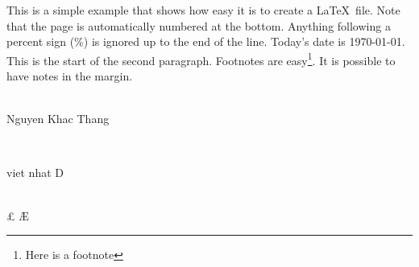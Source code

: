 \documentclass[12pt,a4paper]{article}
\begin{document}
This is a simple example that shows how easy it is to create a
\LaTeX\ file.
Note that the page is automatically numbered at the bottom. Anything following a percent sign (\%) is ignored up to the end of the line. 
Today’s date is \today.
This is the start of the second paragraph. Footnotes are easy\footnote{Here is a footnote}.
It is possible to have notes in the margin.\\ \\
\begin{rmfamily}
Nguyen Khac Thang
\end{rmfamily}\\
\begin{Huge}
viet nhat D 
\end{Huge}\\
\pounds
\AE
\normalfont
\end{document}
